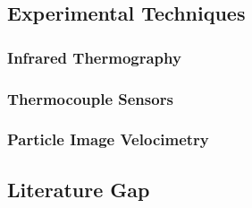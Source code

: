 \pagebreak
\subsection{Experimental Techniques}
\subsubsection{Infrared Thermography}
\subsubsection{Thermocouple Sensors}
\subsubsection{Particle Image Velocimetry}

\pagebreak
\subsection{Literature Gap}

\pagebreak



